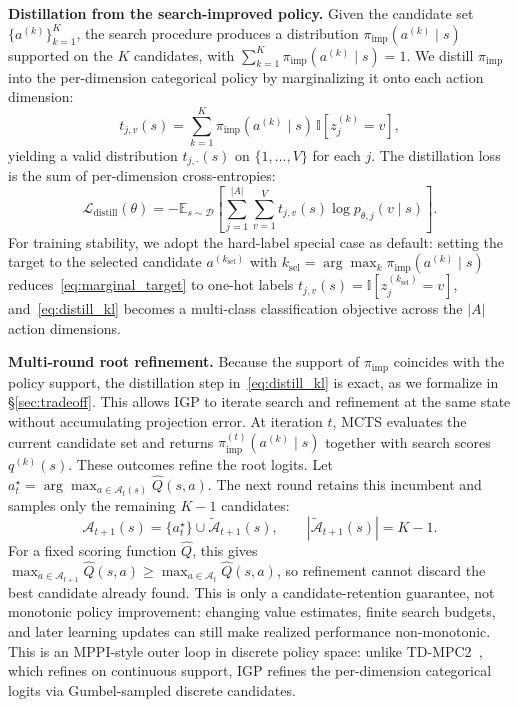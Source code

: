 \textbf{Distillation from the search-improved policy.}
Given the candidate set $\{a^{(k)}\}_{k=1}^{K}$, the search procedure produces a distribution $\pi_{\mathrm{imp}}(a^{(k)}\mid s)$ supported on the $K$ candidates, with $\sum_{k=1}^{K}\pi_{\mathrm{imp}}(a^{(k)}\mid s)=1$. We distill $\pi_{\mathrm{imp}}$ into the per-dimension categorical policy by marginalizing it onto each action dimension:
\begin{equation}
t_{j,v}(s)
=
\sum_{k=1}^{K}\pi_{\mathrm{imp}}(a^{(k)}\mid s)\,\mathbb{I}\!\left[z^{(k)}_j=v\right],
\label{eq:marginal_target}
\end{equation}
yielding a valid distribution $t_{j,\cdot}(s)$ on $\{1,\ldots,V\}$ for each $j$. The distillation loss is the sum of per-dimension cross-entropies:
\begin{equation}
\mathcal L_{\mathrm{distill}}(\theta)
=
-\mathbb E_{s\sim\mathcal D}\!\left[
\sum_{j=1}^{|A|}\sum_{v=1}^{V} t_{j,v}(s)\log p_{\theta,j}(v\mid s)
\right].
\label{eq:distill_kl}
\end{equation}
For training stability, we adopt the hard-label special case as default: setting the target to the selected candidate $a^{(k_{\mathrm{sel}})}$ with $k_{\mathrm{sel}}=\arg\max_k \pi_{\mathrm{imp}}(a^{(k)}\mid s)$ reduces~\eqref{eq:marginal_target} to one-hot labels $t_{j,v}(s)=\mathbb{I}[z^{(k_{\mathrm{sel}})}_j=v]$, and~\eqref{eq:distill_kl} becomes a multi-class classification objective across the $|A|$ action dimensions.

\textbf{Multi-round root refinement.}
Because the support of $\pi_{\mathrm{imp}}$ coincides with the policy support, the distillation step in~\eqref{eq:distill_kl} is exact, as we formalize in \S\ref{sec:tradeoff}. This allows IGP to iterate search and refinement at the same state without accumulating projection error. At iteration $t$, MCTS evaluates the current candidate set and returns $\pi_{\mathrm{imp}}^{(t)}(a^{(k)}\mid s)$ together with search scores $q^{(k)}(s)$. These outcomes refine the root logits. {\color{blue}Let $a_t^\star=\arg\max_{a\in\mathcal A_t(s)}\widehat Q(s,a)$. The next round retains this incumbent and samples only the remaining $K-1$ candidates:
\[
\mathcal A_{t+1}(s)=\{a_t^\star\}\cup\widetilde{\mathcal A}_{t+1}(s),
\qquad |\widetilde{\mathcal A}_{t+1}(s)|=K-1.
\]
For a fixed scoring function $\widehat Q$, this gives
$\max_{a\in\mathcal A_{t+1}}\widehat Q(s,a)\ge
\max_{a\in\mathcal A_t}\widehat Q(s,a)$, so refinement cannot discard the best candidate already found. This is only a candidate-retention guarantee, not monotonic policy improvement: changing value estimates, finite search budgets, and later learning updates can still make realized performance non-monotonic.} This is an MPPI-style outer loop in discrete policy space: unlike TD-MPC2~\citep{hansen2023td}, which refines on continuous support, IGP refines the per-dimension categorical logits via Gumbel-sampled discrete candidates.

